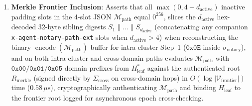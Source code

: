 \documentclass[conference,10pt]{IEEEtran}
\begin{document}
{\begin{enumerate}
    \item \textbf{Merkle Frontier Inclusion}: Asserts that all $\max(0, 4 - d_{\text{active}})$ inactive padding slots in the 4-slot JSON $\mathcal{M}_{\text{path}}$ equal $0^{256}$, slices the $d_{\text{active}}$ hex-decoded 32-byte sibling digests $S_1 \parallel \dots \parallel S_{d_{\text{active}}}$ (concatenating any companion \texttt{x-agent-notary-path-ext} slots when $d_{\text{active}} > 4$) when reconstructing the binary $\operatorname{encode}(\mathcal{M}_{\text{path}})$ buffer for intra-cluster Step~1 ($\mathtt{0x0E}$ inside $\sigma_{\text{notary}}$), and on both intra-cluster and cross-domain paths evaluates $\mathcal{M}_{\text{path}}$ with $\mathtt{0x00}/\mathtt{0x01}/\mathtt{0x05}$ domain prefixes from $H_{\text{leaf}}^*$ against the authenticated root $R_{\text{merkle}}$ (signed directly by $\Sigma_{\text{cross}}$ on cross-domain hops) in $O(\log |\mathcal{V}_{\text{frontier}}|)$ time ($0.58\,\mu\text{s}$), cryptographically authenticating $\mathcal{M}_{\text{path}}$ and binding $H_{\text{leaf}}$ to the frontier root logged for asynchronous epoch cross-checking.

\end{enumerate}}
\end{document}
